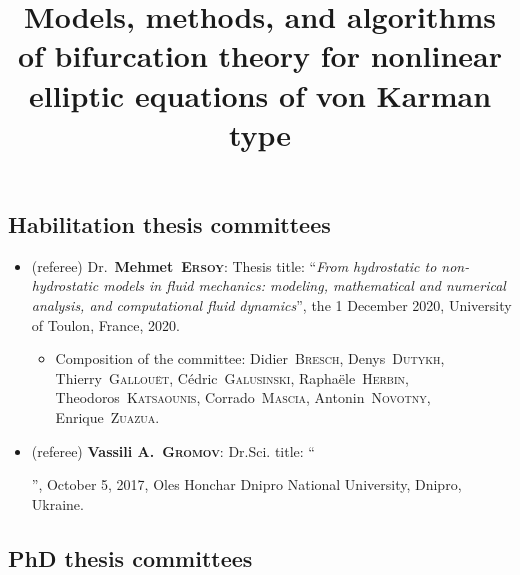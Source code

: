 \documentclass[final, a4paper, oneside, 12pt]{article}
\numberwithin{equation}{section}
\begin{document}

\subsection{Habilitation thesis committees}

\begin{itemize}

  \item (referee) Dr.~\textbf{Mehmet~\textsc{Ersoy}}: Thesis title: ``\textit{From hydrostatic to non-hydrostatic models in fluid mechanics: modeling, mathematical and numerical analysis, and computational fluid dynamics}'', the 1 December 2020, University of Toulon, France, 2020.
  
  \begin{itemize}
    
    \item Composition of the committee: Didier~\textsc{Bresch}, Denys~\textsc{Dutykh}, Thierry~\textsc{Gallou\"et}, C\'edric~\textsc{Galusinski}, Rapha\"ele~\textsc{Herbin}, Theodoros~\textsc{Katsaounis}, Corrado~\textsc{Mascia}, Antonin~\textsc{Novotny}, Enrique~\textsc{Zuazua}.
    
  \end{itemize}
  
  \item (referee) \textbf{Vassili A.~\textsc{Gromov}}: Dr.Sci. title: ``\title{Models, methods, and algorithms of bifurcation theory for nonlinear elliptic equations of von Karman type}'', October 5, 2017, Oles Honchar Dnipro National University, Dnipro, Ukraine.

\end{itemize}

\subsection{PhD thesis committees}
\end{document}
